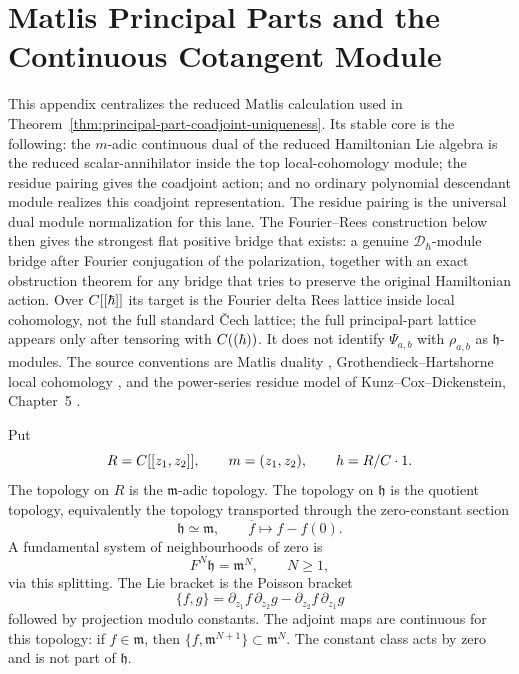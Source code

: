 \section{Matlis Principal Parts and the Continuous Cotangent Module}
\label{sec:app-matlis-principal-parts}

This appendix centralizes the reduced Matlis calculation used in
Theorem~\ref{thm:principal-part-coadjoint-uniqueness}.  Its stable core is the
following: the \(m\)-adic continuous dual of the reduced Hamiltonian
Lie algebra is the reduced scalar-annihilator inside the top
local-cohomology module; the residue pairing gives the coadjoint
action; and no ordinary polynomial descendant module realizes this
coadjoint representation.  The residue pairing is the universal dual
module normalization for this lane.  The Fourier--Rees construction below
then gives the strongest flat positive bridge that exists: a genuine
\(\mathcal D_\hbar\)-module bridge after Fourier conjugation of the
polarization, together with an exact obstruction theorem for any bridge
that tries to preserve the original Hamiltonian action.  Over
\(C[[\hbar]]\) its target is the Fourier delta Rees lattice inside local
cohomology, not the full standard \v{C}ech lattice; the full principal-part
lattice appears only after tensoring with \(C((\hbar))\).  It does not
identify \(\Psi_{a,b}\) with \(\rho_{a,b}\) as \(\mathfrak h\)-modules.
The source conventions are
Matlis duality
\cite{matlis-injective}, Grothendieck--Hartshorne local cohomology
\cite{hartshorne-local-cohomology}, and the power-series residue model
of Kunz--Cox--Dickenstein, Chapter~5
\cite{kunz-residues-duality}.

\begin{defn}
\label{def:app-matlis-topology}
  Put
  \[
    R=C[[z_1,z_2]],\qquad m=(z_1,z_2),\qquad
    h=R/C\cdot1 .
  \]
  The topology on \(R\) is the \(\mathfrak m\)-adic topology.  The
  topology on \(\mathfrak h\) is the quotient topology, equivalently
  the topology transported through the zero-constant section
  \[
    \mathfrak h\simeq \mathfrak m,\qquad
    \overline f\longmapsto f-f(0).
  \]
  A fundamental system of neighbourhoods of zero is
  \[
    F^N\mathfrak h=\mathfrak m^N,\qquad N\geq1,
  \]
  via this splitting.  The Lie bracket is the Poisson bracket
  \[
    \{f,g\}=\partial_{z_1}f\,\partial_{z_2}g
      -\partial_{z_2}f\,\partial_{z_1}g
  \]
  followed by projection modulo constants.  The adjoint maps are continuous
  for this topology: if \(f\in\mathfrak m\), then
  \(\{f,\mathfrak m^{N+1}\}\subset \mathfrak m^N\).  The constant class
  acts by zero and is not part of \(\mathfrak h\).
\end{defn}

